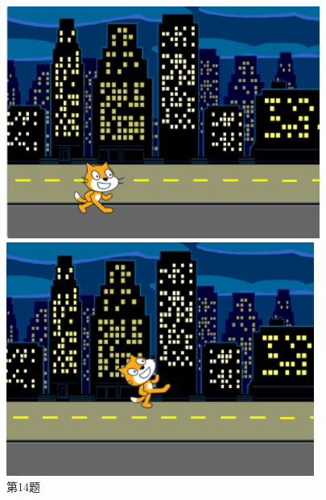 \documentclass[10pt, a4paper]{article}
\begin{document}
\begin{enumerate}
\begin{figure}[htbp]
\begin{minipage}[t]{.45\textwidth}
\begin{minipage}[t]{.45\textwidth}
                    \includegraphics[width=\textwidth]{14-1.png}
                \end{minipage}
                \begin{minipage}[t]{.45\textwidth}
                    \centering
                    \includegraphics[width=\textwidth]{14-2.png}
                \end{minipage}
                \caption*{第14题}
            \end{minipage}
        \end{figure}


\end{enumerate}
\end{document}
